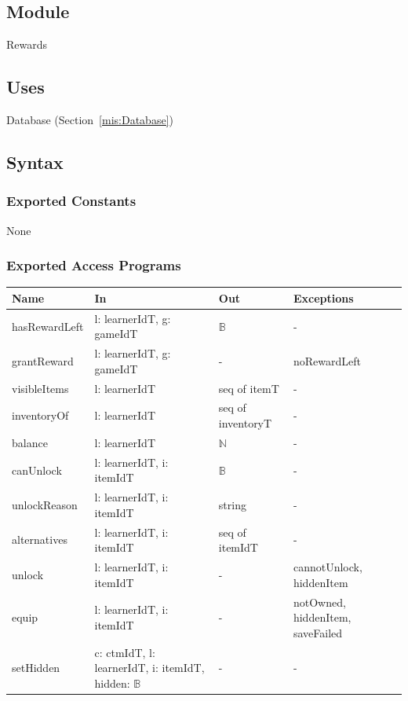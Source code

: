 \documentclass[12pt, titlepage]{article}
\newcommand{\Mref}[1]{Section~\ref{#1}}
\begin{document}
\subsection{Module}

Rewards

\subsection{Uses}

Database (\Mref{mis:Database})

\subsection{Syntax}

\subsubsection{Exported Constants}

None

\subsubsection{Exported Access Programs}

\begin{center}
\small
\begin{tabular}{p{3.3cm} p{4.7cm} p{2.6cm} p{2.8cm}}
\hline
\textbf{Name} & \textbf{In} & \textbf{Out} & \textbf{Exceptions} \\
\hline
hasRewardLeft & l: learnerIdT, g: gameIdT & $\mathbb{B}$ & - \\
grantReward & l: learnerIdT, g: gameIdT & - & noRewardLeft \\
visibleItems & l: learnerIdT & seq of itemT & - \\
inventoryOf & l: learnerIdT & seq of inventoryT & - \\
balance & l: learnerIdT & $\mathbb{N}$ & - \\
canUnlock & l: learnerIdT, i: itemIdT & $\mathbb{B}$ & - \\
unlockReason & l: learnerIdT, i: itemIdT & string & - \\
alternatives & l: learnerIdT, i: itemIdT & seq of itemIdT & - \\
unlock & l: learnerIdT, i: itemIdT & - & cannotUnlock, hiddenItem \\
equip & l: learnerIdT, i: itemIdT & - & notOwned, hiddenItem, saveFailed \\
setHidden & c: ctmIdT, l: learnerIdT, i: itemIdT, hidden: $\mathbb{B}$ & - & - \\
\hline
\end{tabular}
\end{center}
\end{document}
